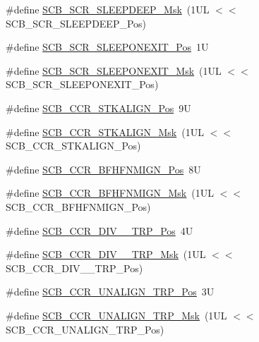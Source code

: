 \begin{DoxyCompactItemize}
\item 
\#define \hyperlink{group___c_m_s_i_s___s_c_b_ga77c06a69c63f4b3f6ec1032e911e18e7}{S\-C\-B\-\_\-\-S\-C\-R\-\_\-\-S\-L\-E\-E\-P\-D\-E\-E\-P\-\_\-\-Msk}~(1\-U\-L $<$$<$ S\-C\-B\-\_\-\-S\-C\-R\-\_\-\-S\-L\-E\-E\-P\-D\-E\-E\-P\-\_\-\-Pos)
\item 
\#define \hyperlink{group___c_m_s_i_s___s_c_b_ga3680a15114d7fdc1e25043b881308fe9}{S\-C\-B\-\_\-\-S\-C\-R\-\_\-\-S\-L\-E\-E\-P\-O\-N\-E\-X\-I\-T\-\_\-\-Pos}~1\-U
\item 
\#define \hyperlink{group___c_m_s_i_s___s_c_b_ga50a243e317b9a70781b02758d45b05ee}{S\-C\-B\-\_\-\-S\-C\-R\-\_\-\-S\-L\-E\-E\-P\-O\-N\-E\-X\-I\-T\-\_\-\-Msk}~(1\-U\-L $<$$<$ S\-C\-B\-\_\-\-S\-C\-R\-\_\-\-S\-L\-E\-E\-P\-O\-N\-E\-X\-I\-T\-\_\-\-Pos)
\item 
\#define \hyperlink{group___c_m_s_i_s___s_c_b_gac2d20a250960a432cc74da59d20e2f86}{S\-C\-B\-\_\-\-C\-C\-R\-\_\-\-S\-T\-K\-A\-L\-I\-G\-N\-\_\-\-Pos}~9\-U
\item 
\#define \hyperlink{group___c_m_s_i_s___s_c_b_ga33cf22d3d46af158a03aad25ddea1bcb}{S\-C\-B\-\_\-\-C\-C\-R\-\_\-\-S\-T\-K\-A\-L\-I\-G\-N\-\_\-\-Msk}~(1\-U\-L $<$$<$ S\-C\-B\-\_\-\-C\-C\-R\-\_\-\-S\-T\-K\-A\-L\-I\-G\-N\-\_\-\-Pos)
\item 
\#define \hyperlink{group___c_m_s_i_s___s_c_b_ga4010a4f9e2a745af1b58abe1f791ebbf}{S\-C\-B\-\_\-\-C\-C\-R\-\_\-\-B\-F\-H\-F\-N\-M\-I\-G\-N\-\_\-\-Pos}~8\-U
\item 
\#define \hyperlink{group___c_m_s_i_s___s_c_b_ga89a28cc31cfc7d52d9d7a8fcc69c7eac}{S\-C\-B\-\_\-\-C\-C\-R\-\_\-\-B\-F\-H\-F\-N\-M\-I\-G\-N\-\_\-\-Msk}~(1\-U\-L $<$$<$ S\-C\-B\-\_\-\-C\-C\-R\-\_\-\-B\-F\-H\-F\-N\-M\-I\-G\-N\-\_\-\-Pos)
\item 
\#define \hyperlink{group___c_m_s_i_s___s_c_b_gac8d512998bb8cd9333fb7627ddf59bba}{S\-C\-B\-\_\-\-C\-C\-R\-\_\-\-D\-I\-V\-\_\-\_\-\-T\-R\-P\-\_\-\-Pos}~4\-U
\item 
\#define \hyperlink{group___c_m_s_i_s___s_c_b_gabb9aeac71b3abd8586d0297070f61dcb}{S\-C\-B\-\_\-\-C\-C\-R\-\_\-\-D\-I\-V\-\_\-\_\-\-T\-R\-P\-\_\-\-Msk}~(1\-U\-L $<$$<$ S\-C\-B\-\_\-\-C\-C\-R\-\_\-\-D\-I\-V\-\_\-\_\-\-T\-R\-P\-\_\-\-Pos)
\item 
\#define \hyperlink{group___c_m_s_i_s___s_c_b_gac4e4928b864ea10fc24dbbc57d976229}{S\-C\-B\-\_\-\-C\-C\-R\-\_\-\-U\-N\-A\-L\-I\-G\-N\-\_\-\-T\-R\-P\-\_\-\-Pos}~3\-U
\item 
\#define \hyperlink{group___c_m_s_i_s___s_c_b_ga68c96ad594af70c007923979085c99e0}{S\-C\-B\-\_\-\-C\-C\-R\-\_\-\-U\-N\-A\-L\-I\-G\-N\-\_\-\-T\-R\-P\-\_\-\-Msk}~(1\-U\-L $<$$<$ S\-C\-B\-\_\-\-C\-C\-R\-\_\-\-U\-N\-A\-L\-I\-G\-N\-\_\-\-T\-R\-P\-\_\-\-Pos)

\end{DoxyCompactItemize}
